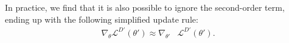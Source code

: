 In practice, we find that it is also possible to ignore the second-order term, ending up with the following simplified update rule:
\begin{align}
\label{cp6.eq.meta-grad-first}
    \nabla_\theta \mathcal{L}^{D'}(\theta') \approx
    \nabla_{\theta'} & \mathcal{L}^{D'}(\theta').
\end{align}









